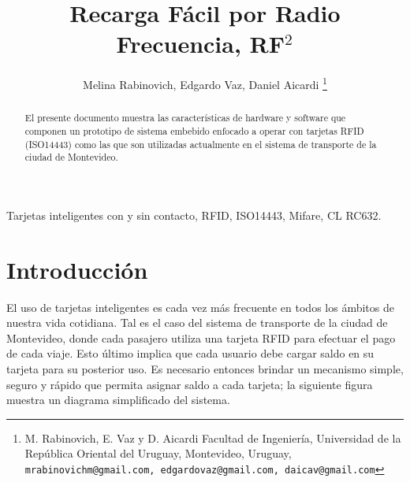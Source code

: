 \documentclass[%
        final,
        notitlepage,
        narroweqnarray,
        inline,
        ]{ieee}
\begin{document}
\title[Specification for Common IEEE Styles]{%
       Recarga Fácil por Radio Frecuencia, RF$^{2}$}

\author[SHORT NAMES]{%
	 Melina Rabinovich, Edgardo Vaz, Daniel Aicardi
	\thanks{M. Rabinovich, E. Vaz y  D. Aicardi Facultad de Ingeniería, Universidad de la República Oriental del Uruguay, Montevideo, Uruguay,
		{\tt\small mrabinovichm@gmail.com, edgardovaz@gmail.com, daicav@gmail.com} }
}





\maketitle               

\begin{abstract}
El presente documento muestra las características de hardware y software que componen un prototipo de sistema embebido enfocado a operar con tarjetas RFID (ISO14443) como las que son utilizadas actualmente en el sistema de transporte de la ciudad de Montevideo.
\end{abstract}

\bigskip

\begin{keywords}
Tarjetas inteligentes con y sin contacto, RFID, ISO14443, Mifare, CL RC632.
\end{keywords}

\section{Introducción}

\PARstart El uso de tarjetas inteligentes es cada vez más frecuente en todos los ámbitos de nuestra vida cotidiana. 
Tal es el caso del sistema de transporte de la ciudad de Montevideo, donde cada pasajero utiliza una tarjeta RFID 
para efectuar el pago de cada viaje. Esto último implica que cada usuario debe cargar saldo en su tarjeta para su 
posterior uso. Es necesario entonces brindar un mecanismo simple, seguro y rápido que permita asignar saldo a cada tarjeta; la siguiente figura muestra un diagrama simplificado del sistema.
\end{document}
